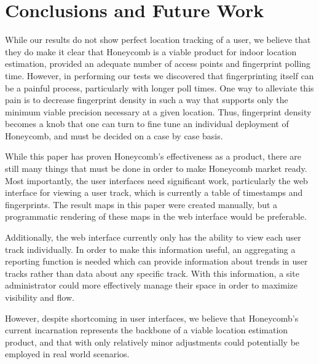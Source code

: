 \chapter{Conclusions and Future Work}
\label{discussion}
%


While our results do not show perfect location tracking of a user, we believe that they do make it clear that Honeycomb is a viable product for indoor location estimation, provided an adequate number of access points and fingerprint polling time. However, in performing our tests we discovered that fingerprinting itself can be a painful process, particularly with longer poll times. One way to alleviate this pain is to decrease fingerprint density in such a way that supports only the minimum viable precision necessary at a given location. Thus, fingerprint density becomes a knob that one can turn to fine tune an individual deployment of Honeycomb, and must be decided on a case by case basis. 

While this paper has proven Honeycomb's effectiveness as a product, there are still many things that must be done in order to make Honeycomb market ready. Most importantly, the user interfaces need significant work, particularly the web interface for viewing a user track, which is currently a table of timestamps and fingerprints. The result maps in this paper were created manually, but a programmatic rendering of these maps in the web interface would be preferable. 

Additionally, the web interface currently only has the ability to view each user track individually. In order to make this information useful, an aggregating a reporting function is needed which can provide information about trends in user tracks rather than data about any specific track. With this information, a site administrator could more effectively manage their space in order to maximize visibility and flow. 

However, despite shortcoming in user interfaces, we believe that Honeycomb's current incarnation represents the backbone of a viable location estimation product, and that with only relatively minor adjustments could potentially be employed in real world scenarios. 